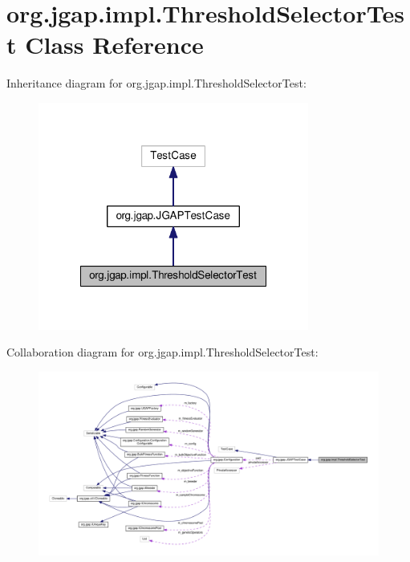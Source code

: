 \hypertarget{classorg_1_1jgap_1_1impl_1_1_threshold_selector_test}{\section{org.\-jgap.\-impl.\-Threshold\-Selector\-Test Class Reference}
\label{classorg_1_1jgap_1_1impl_1_1_threshold_selector_test}
}


Inheritance diagram for org.\-jgap.\-impl.\-Threshold\-Selector\-Test\-:
\nopagebreak
\begin{figure}[H]
\begin{center}
\leavevmode
\includegraphics[width=252pt]{classorg_1_1jgap_1_1impl_1_1_threshold_selector_test__inherit__graph}
\end{center}
\end{figure}


Collaboration diagram for org.\-jgap.\-impl.\-Threshold\-Selector\-Test\-:
\nopagebreak
\begin{figure}[H]
\begin{center}
\leavevmode
\includegraphics[width=350pt]{classorg_1_1jgap_1_1impl_1_1_threshold_selector_test__coll__graph}
\end{center}
\end{figure}
